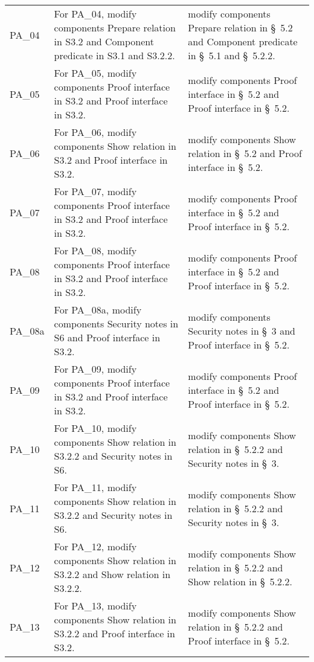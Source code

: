 \begin{landscape}
\begin{longtable}{p{3cm} p{10cm} p{7cm}}
PA\_04 &
For PA\_04, modify components Prepare relation in S3.2 and Component predicate in S3.1 and S3.2.2. &
modify components Prepare relation in \S~5.2 and Component predicate in \S~5.1 and \S~5.2.2. \\

PA\_05 &
For PA\_05, modify components Proof interface in S3.2 and Proof interface in S3.2. &
modify components Proof interface in \S~5.2 and Proof interface in \S~5.2. \\

PA\_06 &
For PA\_06, modify components Show relation in S3.2 and Proof interface in S3.2. &
modify components Show relation in \S~5.2 and Proof interface in \S~5.2. \\

PA\_07 &
For PA\_07, modify components Proof interface in S3.2 and Proof interface in S3.2. &
modify components Proof interface in \S~5.2 and Proof interface in \S~5.2. \\

PA\_08 &
For PA\_08, modify components Proof interface in S3.2 and Proof interface in S3.2. &
modify components Proof interface in \S~5.2 and Proof interface in \S~5.2. \\

PA\_08a &
For PA\_08a, modify components Security notes in S6 and Proof interface in S3.2. &
modify components Security notes in \S~3 and Proof interface in \S~5.2. \\

PA\_09 &
For PA\_09, modify components Proof interface in S3.2 and Proof interface in S3.2. &
modify components Proof interface in \S~5.2 and Proof interface in \S~5.2. \\

PA\_10 &
For PA\_10, modify components Show relation in S3.2.2 and Security notes in S6. &
modify components Show relation in \S~5.2.2 and Security notes in \S~3. \\

PA\_11 &
For PA\_11, modify components Show relation in S3.2.2 and Security notes in S6. &
modify components Show relation in \S~5.2.2 and Security notes in \S~3. \\

PA\_12 &
For PA\_12, modify components Show relation in S3.2.2 and Show relation in S3.2.2. &
modify components Show relation in \S~5.2.2 and Show relation in \S~5.2.2. \\

PA\_13 &
For PA\_13, modify components Show relation in S3.2.2 and Proof interface in S3.2. &
modify components Show relation in \S~5.2.2 and Proof interface in \S~5.2. \\


\end{longtable}
\end{landscape}
